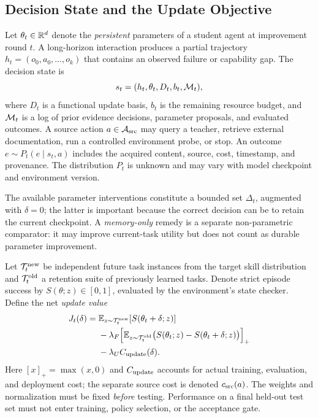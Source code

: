\subsection{Decision State and the Update Objective}
Let $\theta_t\in\mathbb{R}^d$ denote the \emph{persistent} parameters of a
student agent at improvement round $t$. A long-horizon interaction
produces a partial trajectory $h_t=(o_0,a_0,\ldots,o_k)$ that contains
an observed failure or capability gap. The decision state is
\begin{equation}
s_t=(h_t,\theta_t,D_t,b_t,\mathcal{M}_t),
\end{equation}
where $D_t$ is a functional update basis, $b_t$ is the remaining
resource budget, and $\mathcal{M}_t$ is a log of prior evidence decisions,
parameter proposals, and evaluated outcomes. A source action
$a\in\mathcal{A}_{\mathrm{src}}$ may query a teacher, retrieve external
documentation, run a controlled environment probe, or stop.
An outcome $e\sim P_t(e\mid s_t,a)$ includes the acquired content,
source, cost, timestamp, and provenance. The distribution $P_t$ is
unknown and may vary with model checkpoint and environment version.

The available parameter interventions constitute a bounded set
$\Delta_t$, augmented with $\delta=0$; the latter is important because
the correct decision can be to retain the current checkpoint.
A \emph{memory-only} remedy is a separate non-parametric comparator:
it may improve current-task utility but does not count as durable
parameter improvement.

Let $\mathcal{T}^{\rm new}_t$ be independent future task instances from
the target skill distribution and $\mathcal{T}^{\rm old}_t$ a retention
suite of previously learned tasks. Denote strict episode success by
$S(\theta;z)\in[0,1]$, evaluated by the environment's state checker.
Define the net \emph{update value}
\begin{align}
J_t(\delta) ={}&
  \mathbb{E}_{z\sim\mathcal{T}^{\rm new}_t}[S(\theta_t+\delta;z)]
     \nonumber\\
 &-\lambda_F\Big[
     \mathbb{E}_{z\sim\mathcal{T}^{\rm old}_t}
     \big(S(\theta_t;z)-S(\theta_t+\delta;z)\big)
   \Big]_+ \nonumber\\
 &-\lambda_U C_{\rm update}(\delta).
\label{eq:updatevalue}
\end{align}
Here $[x]_+=\max(x,0)$ and $C_{\rm update}$ accounts for actual
training, evaluation, and deployment cost; the separate source cost is
denoted $c_{\rm src}(a)$. The weights and normalization must be fixed
\emph{before} testing. Performance on a final held-out test set must
not enter training, policy selection, or the acceptance gate.

